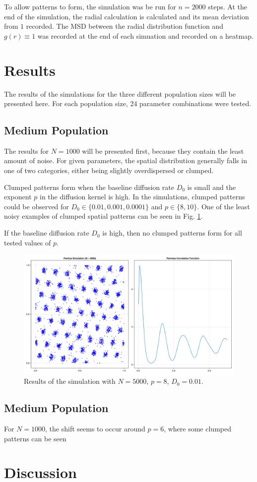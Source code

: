 \documentclass{article}
\begin{document}
To allow patterns to form, the simulation was be run for $n=2000$ steps. 
At the end of the simulation, the radial calculation is calculated and its mean deviation from $1$ recorded. 
The MSD between the radial distribution function and $g(r) \equiv 1$ was recorded at the end of each simuation and recorded on a heatmap.

\section{Results} 
The results of the simulations for the three different population sizes will be presented here.
For each population size, 24 parameter combinations were tested.





\subsection{Medium Population}
The results for $N=1000$ will be presented first, because they contain the least amount of noise.
For given parameters, the spatial distribution generally falls in one of two categories, either being slightly overdispersed or clumped. 

Clumped patterns form when the baseline diffusion rate $D_0$ is small and the exponent $p$ in the diffusion kernel is high. 
In the simulations, clumped patterns could be observed for $D_0 \in \{0.01, 0.001, 0.0001\}$ and $p\in\{8, 10\}$.
One of the least noisy examples of clumped spatial patterns can be seen in Fig. \ref{rp68}.

If the baseline diffusion rate $D_0$ is high, then no clumped patterns form for all tested values of $p$. 
\begin{figure}
    \label{rp68}
    \includegraphics[width=1.0\linewidth]{img/rp68_N5000_D01_p8.png}
    \caption{Results of the simulation with $N=5000$, $p=8$, $D_0=0.01$.}
\end{figure}

\subsection{Medium Population}

For $N=1000$, the shift seems to occur around $p=6$, where some clumped patterns can be seen 
\section{Discussion}
\printbibliography
\end{document}
